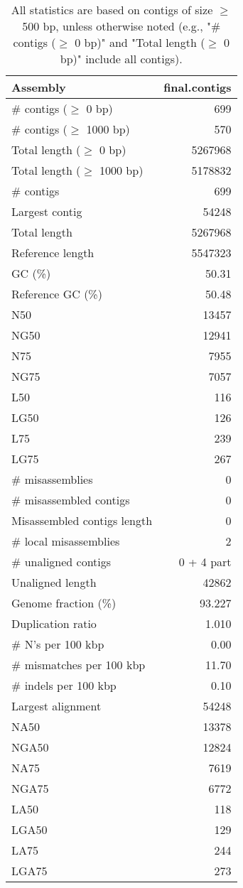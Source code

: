 \documentclass[12pt,a4paper]{article}
\begin{document}
\begin{table}[ht]
\begin{center}
\caption{All statistics are based on contigs of size $\geq$ 500 bp, unless otherwise noted (e.g., "\# contigs ($\geq$ 0 bp)" and "Total length ($\geq$ 0 bp)" include all contigs).}
\begin{tabular}{|l*{1}{|r}|}
\hline
Assembly & final.contigs \\ \hline
\# contigs ($\geq$ 0 bp) & 699 \\ \hline
\# contigs ($\geq$ 1000 bp) & 570 \\ \hline
Total length ($\geq$ 0 bp) & 5267968 \\ \hline
Total length ($\geq$ 1000 bp) & 5178832 \\ \hline
\# contigs & 699 \\ \hline
Largest contig & 54248 \\ \hline
Total length & 5267968 \\ \hline
Reference length & 5547323 \\ \hline
GC (\%) & 50.31 \\ \hline
Reference GC (\%) & 50.48 \\ \hline
N50 & 13457 \\ \hline
NG50 & 12941 \\ \hline
N75 & 7955 \\ \hline
NG75 & 7057 \\ \hline
L50 & 116 \\ \hline
LG50 & 126 \\ \hline
L75 & 239 \\ \hline
LG75 & 267 \\ \hline
\# misassemblies & 0 \\ \hline
\# misassembled contigs & 0 \\ \hline
Misassembled contigs length & 0 \\ \hline
\# local misassemblies & 2 \\ \hline
\# unaligned contigs & 0 + 4 part \\ \hline
Unaligned length & 42862 \\ \hline
Genome fraction (\%) & 93.227 \\ \hline
Duplication ratio & 1.010 \\ \hline
\# N's per 100 kbp & 0.00 \\ \hline
\# mismatches per 100 kbp & 11.70 \\ \hline
\# indels per 100 kbp & 0.10 \\ \hline
Largest alignment & 54248 \\ \hline
NA50 & 13378 \\ \hline
NGA50 & 12824 \\ \hline
NA75 & 7619 \\ \hline
NGA75 & 6772 \\ \hline
LA50 & 118 \\ \hline
LGA50 & 129 \\ \hline
LA75 & 244 \\ \hline
LGA75 & 273 \\ \hline
\end{tabular}
\end{center}
\end{table}
\end{document}
